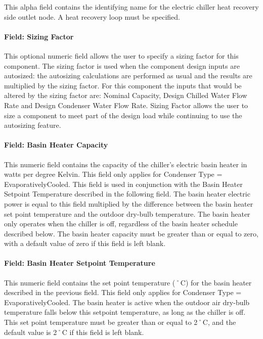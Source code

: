 This alpha field contains the identifying name for the electric chiller heat recovery side outlet node. A heat recovery loop must be specified.

\paragraph{Field: Sizing Factor}\label{field-sizing-factor-3-000}

This optional numeric field allows the user to specify a sizing factor for this component. The sizing factor is used when the component design inputs are autosized: the autosizing calculations are performed as usual and the results are multiplied by the sizing factor. For this component the inputs that would be altered by the sizing factor are: Nominal Capacity, Design Chilled Water Flow Rate and Design Condenser Water Flow Rate. Sizing Factor allows the user to size a component to meet part of the design load while continuing to use the autosizing feature.

\paragraph{Field: Basin Heater Capacity}\label{field-basin-heater-capacity-1-001}

This numeric field contains the capacity of the chiller's electric basin heater in watts per degree Kelvin. This field only applies for Condenser Type = EvaporativelyCooled. This field is used in conjunction with the Basin Heater Setpoint Temperature described in the following field. The basin heater electric power is equal to this field multiplied by the difference between the basin heater set point temperature and the outdoor dry-bulb temperature. The basin heater only operates when the chiller is off, regardless of the basin heater schedule described below. The basin heater capacity must be greater than or equal to zero, with a default value of zero if this field is left blank.

\paragraph{Field: Basin Heater Setpoint Temperature}\label{field-basin-heater-setpoint-temperature-1-001}

This numeric field contains the set point temperature (˚C) for the basin heater described in the previous field. This field only applies for Condenser Type = EvaporativelyCooled. The basin heater is active when the outdoor air dry-bulb temperature falls below this setpoint temperature, as long as the chiller is off. This set point temperature must be greater than or equal to 2˚C, and the default value is 2˚C if this field is left blank.

